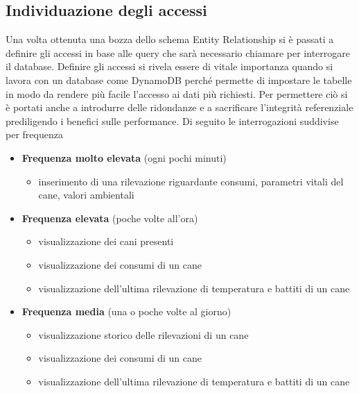    \subsection{Individuazione degli accessi}
    Una volta ottenuta una bozza dello schema Entity Relationship si è passati a definire gli accessi in base alle query che sarà necessario chiamare per interrogare il database.
    Definire gli accessi si rivela essere di vitale importanza quando si lavora con un database come DynamoDB perché permette di impostare le tabelle in modo da rendere più facile l'accesso ai dati più richiesti. Per permettere ciò si è portati anche a introdurre delle ridondanze e a sacrificare l'integrità referenziale prediligendo i benefici sulle performance.
    Di seguito le interrogazioni suddivise per frequenza
    \begin{itemize}
    \item \textbf{Frequenza molto elevata} (ogni pochi minuti)
            \begin{itemize}
                \item inserimento di una rilevazione riguardante consumi, parametri vitali del cane, valori ambientali
            \end{itemize}
    \item \textbf{Frequenza elevata} (poche volte all'ora)
            \begin{itemize}
                \item visualizzazione dei cani presenti
                \item visualizzazione dei consumi di un cane
                \item visualizzazione dell'ultima rilevazione di temperatura e battiti di un cane
            \end{itemize}
    \item \textbf{Frequenza media} (una o poche volte al giorno)        
            \begin{itemize}
                \item visualizzazione storico delle rilevazioni di un cane
                \item visualizzazione dei consumi di un cane
                \item visualizzazione dell'ultima rilevazione di temperatura e battiti di un cane
            \end{itemize}
        
    \end{itemize}